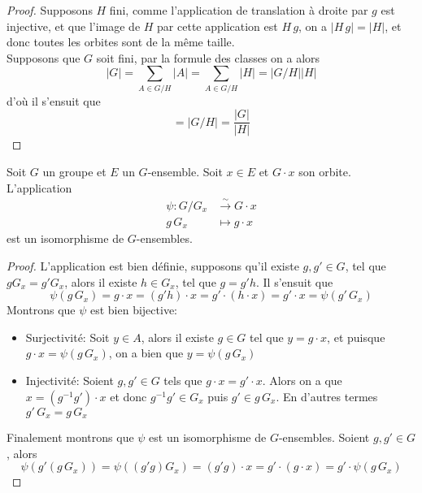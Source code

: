 \begin{proof}
	Supposons $H$ fini, comme l'application de translation à droite par $g$ est injective,
	et que l'image de $H$ par cette application est $H\,g$,
	on a $|H\,g| = |H|$, et donc toutes les orbites sont de la même taille.\\
	Supposons que $G$ soit fini, par la formule des classes on a alors
	\begin{equation*}
		|G| = \sum_{A \in G/H}|A| = \sum_{A \in G/H}|H| = |G/H||H|
	\end{equation*}
	d'où il s'ensuit que
	\begin{equation*}
		[G:H] = |G/H| = \frac{|G|}{|H|}
	\end{equation*}
\end{proof}


\begin{thm}
	Soit $G$ un groupe et $E$ un $G$-ensemble.
	Soit $x \in E$ et $G \cdot x$ son orbite.
	L'application
	\begin{align*}
		\psi : G/G_x &\xrightarrow{\sim} G \cdot x\\
		g\,G_x &\mapsto g \cdot x
	\end{align*}
	est un isomorphisme de $G$-ensembles.
	
\end{thm}

\begin{proof}
	L'application est bien définie, supposons qu'il existe $g, g' \in G$,
	tel que $g G_x = g' G_x$, alors il existe $h \in G_x$,
	tel que $g = g' h$. Il s'ensuit que
	\begin{equation*}
		\psi(g\,G_x) = g \cdot x = (g' h) \cdot x
		= g' \cdot (h \cdot x) = g' \cdot x = \psi(g'\,G_x)
	\end{equation*}
	Montrons que $\psi$ est bien bijective:
	\begin{itemize}
		\item Surjectivité: Soit $y \in A$, alors il existe $g \in G$ tel que $y = g \cdot x$,
			et puisque $g \cdot x = \psi(g\,G_x)$, on a bien que $y = \psi(g\,G_x)$
		\item Injectivité: Soient $g, g' \in G$ tels que
			$g \cdot x = g' \cdot x$. Alors on a que $x = (g^{-1} g') \cdot x$ et donc
			$g^{-1} g' \in G_x$ puis $g' \in g\,G_x$.
			En d'autres termes $g'\,G_x = g\,G_x$
	\end{itemize}
	Finalement montrons que $\psi$ est un isomorphisme de $G$-ensembles.
	Soient $g, g'\in G$, alors
	\begin{equation*}
		\psi(g'(g\,G_x)) = \psi((g' g) G_x)
			= (g' g) \cdot x = g' \cdot (g \cdot x) = g' \cdot \psi(g\,G_x)
	\end{equation*}
\end{proof}

